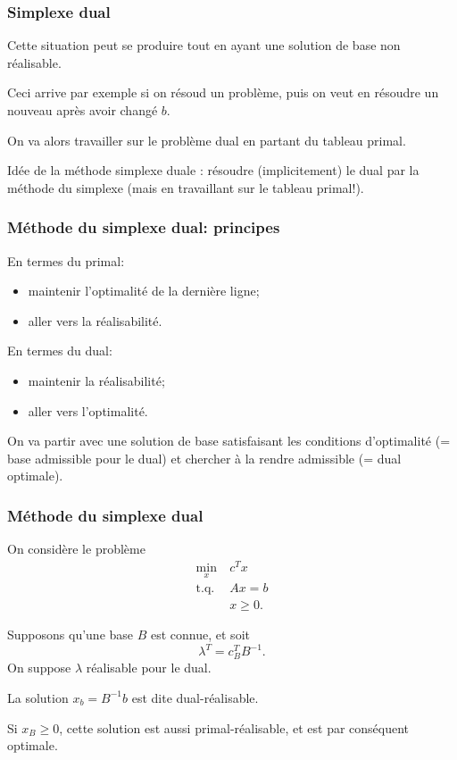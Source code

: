 \documentclass[usepdftitle=false]{beamer}
\begin{document}
\begin{frame}
	\frametitle{Simplexe dual}
	
	Cette situation peut se produire tout en ayant une solution de base non réalisable.
	
	\mbox{}
	
	Ceci arrive par exemple si on résoud un problème, puis on veut en résoudre un nouveau après avoir changé $b$.
	
	\mbox{}
	
	On va alors travailler sur le problème dual en partant du tableau primal.
	
	\mbox{}
	
	Idée de la méthode simplexe duale : résoudre (implicitement) le dual par la méthode du simplexe (mais en travaillant sur le tableau primal!).
	
\end{frame}

\begin{frame}
	\frametitle{Méthode du simplexe dual: principes}
	
	En termes du primal:
	\begin{itemize}
		\item
		maintenir l'optimalité de la dernière ligne;
		\item
		aller vers la réalisabilité.
	\end{itemize}
	
	\mbox{}
	
	En termes du dual:
	\begin{itemize}
		\item
		maintenir la réalisabilité;
		\item
		aller vers l'optimalité.
	\end{itemize}
	
	\mbox{}
	
	On va partir avec une solution de base satisfaisant les conditions d’optimalité (= base admissible pour le dual) et chercher à la rendre admissible (= dual optimale).
	
\end{frame}

\begin{frame}
	\frametitle{Méthode du simplexe dual}
	
	On considère le problème
	\begin{align*}
		\min_x \ & c^Tx \\
		\mbox{t.q. } & Ax = b\\
		& x \geq 0.
	\end{align*}
	
	Supposons qu'une base $B$ est connue, et soit
	\[
	\lambda^T = c_B^T B^{-1}.
	\]
	On suppose $\lambda$ réalisable pour le dual.
	
	\mbox{}
	
	La solution $x_b = B^{-1}b$ est dite \mbox{dual-réalisable}.
	
	\mbox{}
	
	Si $x_B \geq 0$, cette solution est aussi primal-réalisable, et est par conséquent optimale.
	
\end{frame}
\end{document}
